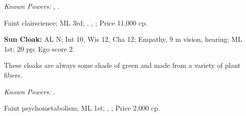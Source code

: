 \textit{Known Powers:}
    , %
    . %

Faint clairscience;
ML 3rd;
,
,
;
Price 11,000 cp.



\textbf{Sun Cloak:}
AL N;
Int 10, Wis 12, Cha 12;
Empathy, 9 m vision, hearing;
ML 1st;
20 pp;
Ego score 2.

These cloaks are always some shade of green and made from a variety of plant fibers.

\textit{Known Powers:}
    . %

Faint psychometabolism;
ML 1st;
,
;
Price 2,000 cp.

